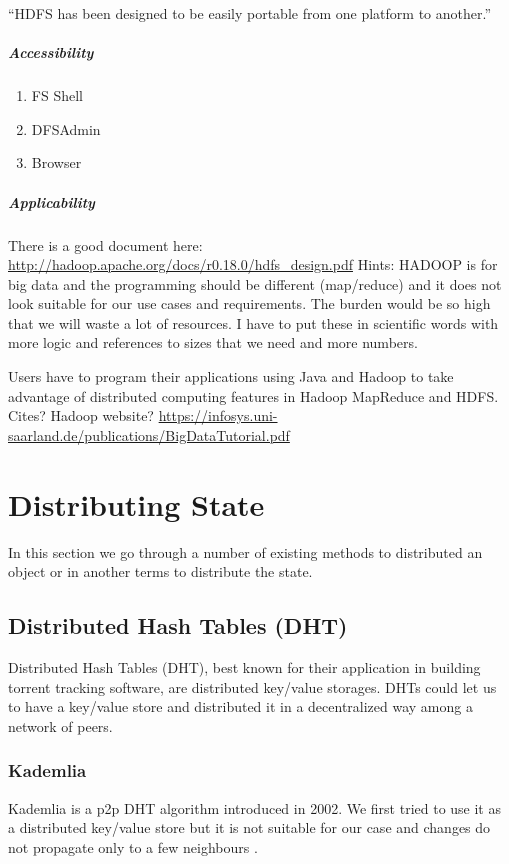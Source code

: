 ``HDFS has been designed to be easily portable from one platform to another.''


\subparagraph{Accessibility}
\begin{enumerate}
\item FS Shell
\item DFSAdmin
\item Browser
\end{enumerate}

\subparagraph{Applicability}
There is a good document here:
\url{http://hadoop.apache.org/docs/r0.18.0/hdfs_design.pdf}
Hints: HADOOP is for big data and the programming should be different (map/reduce)
 and it does not look suitable for our use cases and requirements. The burden would
 be so high that we will waste a lot of resources. I have to put these in scientific
 words with more logic and references to sizes that we need and more numbers.

Users have to program their applications using Java and Hadoop to 
take advantage of distributed computing features in Hadoop MapReduce
and HDFS. Cites? Hadoop website?
\url{https://infosys.uni-saarland.de/publications/BigDataTutorial.pdf}

\section{Distributing State}
In this section we go through a number of existing methods to distributed an object or in another terms to distribute the state.

\subsection{Distributed Hash Tables (DHT)}
Distributed Hash Tables (DHT), best known for their application in building torrent tracking software,
are distributed key/value storages. DHTs could let us to have a key/value store and distributed it in 
a decentralized way among a network of peers.

\subsubsection{Kademlia}
Kademlia is a p2p DHT algorithm introduced in 2002. We first tried to use it as a distributed key/value store but 
it is not suitable for our case and changes do not propagate only to a few neighbours \cite{KademliaPaper}.


